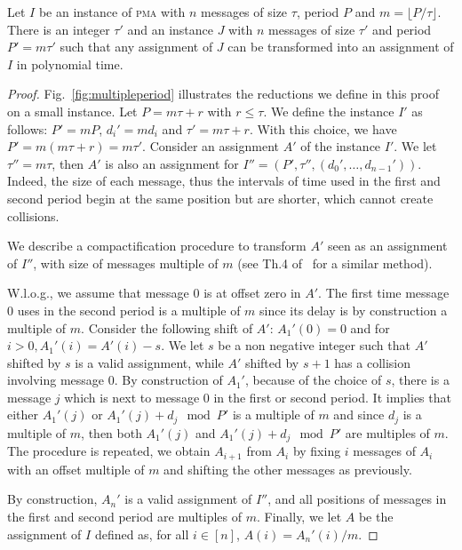 \documentclass[a4paper,UKenglish,cleveref, autoref, thm-restate]{lipics-v2019}
\newcommand\pma{\textsc{pma}\xspace}
\begin{document}
\begin{lemma}\label{lemma:multiple}
Let $I$ be an instance of \pma with $n$ messages of size $\tau$, period $P$ and $m = \lfloor P / \tau \rfloor$. There is an integer $\tau'$ and an instance $J$ with $n$ messages of size $\tau'$ and period $P'= m\tau'$ such that any assignment of $J$ can be transformed into an assignment of $I$ in polynomial time.
\end{lemma}
\begin{proof}
Fig.~\ref{fig:multipleperiod} illustrates the reductions we define in this proof on a small instance.
Let $P = m \tau + r$ with $r \leq \tau$. We define the instance $I'$ as follows: $P' = mP$, $d_{i}' = m d_i$ and $\tau' = m \tau + r$. With this choice, we have $P' = m(m \tau + r) = m \tau'$.
Consider an assignment $A'$ of the instance $I'$. We let $\tau'' = m\tau$, then $A'$ is also an assignment for $I'' = (P',\tau'',(d_{0}',\dots,d_{n-1}'))$. Indeed, the size of each message, thus the intervals of time used in the first and second period begin at the same position but are shorter, which cannot create collisions. 

We describe a compactification procedure to transform $A'$ seen as an assignment of $I''$, with size of messages multiple of $m$ (see Th.4 of~\cite{dominique2018deterministic} for a similar method). 

W.l.o.g., we assume that message $0$ is at offset zero in $A'$. The first time message $0$ uses in the second period is a multiple of $m$ since its delay is by construction a multiple of $m$. Consider the following shift of $A'$: $A_1'(0) = 0$ and for $i>0, A_1'(i) = A'(i) - s$. We let $s$ be a non negative integer such that $A'$ shifted by $s$ is a valid assignment, while $A'$ shifted by $s+1$ has a collision involving message $0$. By construction of $A_1'$, because of the choice of $s$, there is a message $j$ which is next to message $0$ in the first or second period. It implies that either $A_1'(j)$ or $A_1'(j)+d_j \mod P'$ is a multiple of $m$ and since $d_j$ is a multiple of $m$, then both $A_1'(j)$ and $A_1'(j)+d_j \mod P'$ are multiples of $m$. The procedure is repeated, we obtain $A_{i+1}$ from $A_i$ by fixing
$i$ messages of $A_i$ with an offset multiple of $m$ and shifting the other messages as previously. 


By construction, $A_n'$ is a valid assignment of $I''$, and all positions of messages in the first and second period are multiples of $m$. Finally, we let $A$ be the assignment of $I$ defined as, for all $i \in [n]$, $A(i) = A_n'(i)/m$. 
\end{proof}
\end{document}
